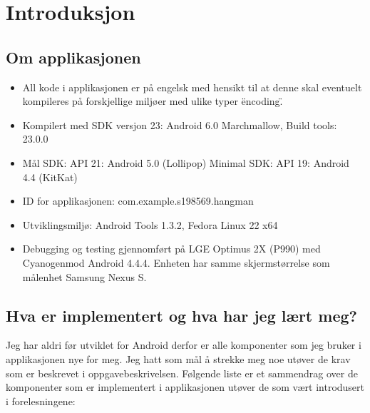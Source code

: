 \chapter{Introduksjon}


\section{Om applikasjonen}
\begin{itemize}
\item All kode i applikasjonen er på engelsk med hensikt til at denne skal eventuelt kompileres på forskjellige miljøer med ulike typer \"encoding\". 
\item Kompilert med SDK versjon 23: Android 6.0 Marchmallow, Build tools: 23.0.0
\item Mål SDK: API 21: Android 5.0 (Lollipop) Minimal SDK: API 19: Android 4.4 (KitKat)
\item ID for applikasjonen: com.example.s198569.hangman
\item Utviklingsmiljø: Android Tools 1.3.2, Fedora Linux 22 x64
\item Debugging og testing gjennomført på LGE Optimus 2X (P990) med Cyanogenmod Android 4.4.4. Enheten har samme skjermstørrelse som målenhet Samsung Nexus S.
\end{itemize}


\section{Hva er implementert og hva har jeg lært meg?}
Jeg har aldri før utviklet for Android derfor er alle komponenter som jeg bruker i applikasjonen nye for meg. Jeg hatt som mål å strekke meg noe utøver de krav som er beskrevet i oppgavebeskrivelsen. Følgende liste er et sammendrag over de komponenter som er implementert i applikasjonen utøver de som vært introdusert i forelesningene:

